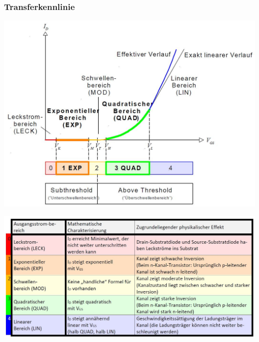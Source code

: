 \subsubsection{Transferkennlinie}
\begin{minipage}{0.4\textwidth}
	\includegraphics[width=1\linewidth]{chapters/Transistoren/images/Transferkennlinie}
\end{minipage}
\begin{minipage}{0.6\textwidth}
	\includegraphics[width=1\linewidth]{chapters/Transistoren/images/Ausgangsstrombereich} 
\end{minipage}

